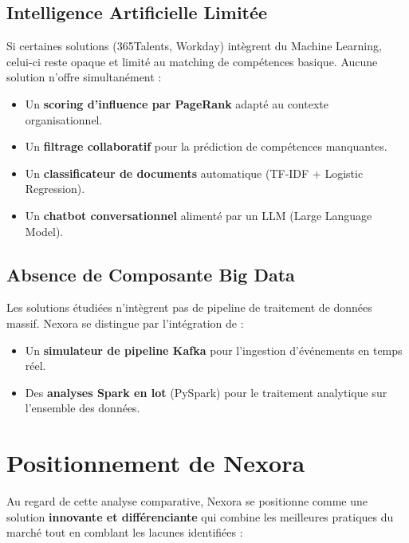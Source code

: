 \documentclass[12pt,a4paper]{article}
\begin{document}
\subsection{Intelligence Artificielle Limitée}

Si certaines solutions (365Talents, Workday) intègrent du Machine Learning, celui-ci reste opaque et limité au matching de compétences basique. Aucune solution n'offre simultanément :
\begin{itemize}[leftmargin=*]
    \item Un \textbf{scoring d'influence par PageRank} adapté au contexte organisationnel.
    \item Un \textbf{filtrage collaboratif} pour la prédiction de compétences manquantes.
    \item Un \textbf{classificateur de documents} automatique (TF-IDF + Logistic Regression).
    \item Un \textbf{chatbot conversationnel} alimenté par un LLM (Large Language Model).
\end{itemize}

\subsection{Absence de Composante Big Data}

Les solutions étudiées n'intègrent pas de pipeline de traitement de données massif. Nexora se distingue par l'intégration de :
\begin{itemize}[leftmargin=*]
    \item Un \textbf{simulateur de pipeline Kafka} pour l'ingestion d'événements en temps réel.
    \item Des \textbf{analyses Spark en lot} (PySpark) pour le traitement analytique sur l'ensemble des données.
\end{itemize}

\section{Positionnement de Nexora}

Au regard de cette analyse comparative, Nexora se positionne comme une solution \textbf{innovante et différenciante} qui combine les meilleures pratiques du marché tout en comblant les lacunes identifiées :
\end{document}
